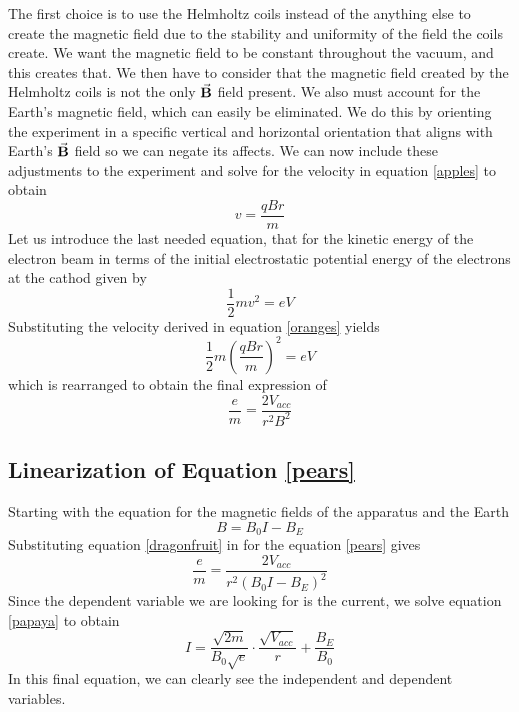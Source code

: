\documentclass[aps,prl,10pt,twocolumn,floatfix]{revtex4-2}
\begin{document}
The first choice is to use the Helmholtz coils instead of the anything else to create the magnetic field due to the stability and uniformity of the field the coils create.
We want the magnetic field to be constant throughout the vacuum, and this creates that.
We then have to consider that the magnetic field created by the Helmholtz coils is not the only $\va{B}$ field present.
We also must account for the Earth's magnetic field, which can easily be eliminated.
We do this by orienting the experiment in a specific vertical and horizontal orientation that aligns with Earth's $\va{B}$ field so we can negate its affects.
We can now include these adjustments to the experiment and solve for the velocity in equation \ref{apples} to obtain
\begin{equation}\label{oranges}
v=\frac{qBr}{m}
\end{equation}
Let us introduce the last needed equation, that for the kinetic energy of the electron beam in terms of the initial electrostatic potential energy of the electrons at the cathod given by
\begin{equation}
\frac{1}{2}mv^2=eV
\end{equation}
Substituting the velocity derived in equation \ref{oranges} yields
\begin{equation*}
\frac{1}{2}m(\frac{qBr}{m})^2=eV
\end{equation*}
which is rearranged to obtain the final expression of
\begin{equation}\label{blueberries}
\frac{e}{m}=\frac{2V_{acc}}{r^2B^2}
\end{equation}

\subsection{Linearization of Equation \ref{pears}}
Starting with the equation for the magnetic fields of the apparatus and the Earth
\begin{equation}\label{dragonfruit}
B=B_0I-B_E
\end{equation}
Substituting equation \ref{dragonfruit} in for the equation \ref{pears} gives
\begin{equation*}\label{papaya}
\frac{e}{m}=\frac{2V_{acc}}{r^2(B_0I-B_E)^2}
\end{equation*}
Since the dependent variable we are looking for is the current, we  solve equation \ref{papaya} to obtain
\begin{equation}
I=\frac{\sqrt{2m}}{B_0\sqrt{e}}\cdot \frac{\sqrt{V_{acc}}}{r}+\frac{B_E}{B_0}
\end{equation}
In this final equation, we can clearly see the independent and dependent variables.
\end{document}
